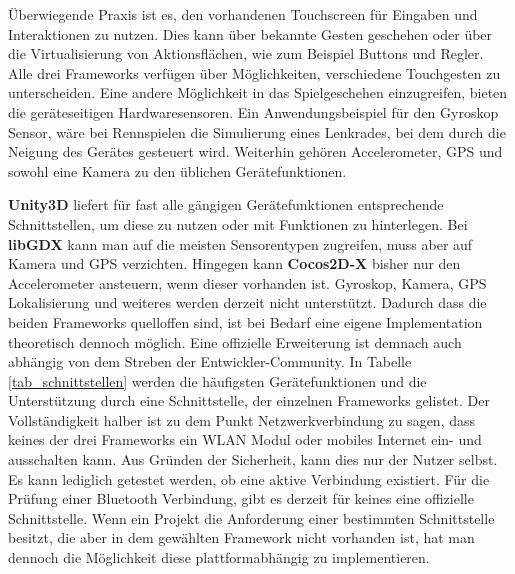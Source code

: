 \bigskip
Überwiegende Praxis ist es, den vorhandenen Touchscreen für Eingaben und Interaktionen zu nutzen. Dies kann über bekannte Gesten geschehen oder über die Virtualisierung von Aktionsflächen, wie zum Beispiel Buttons und Regler. Alle drei Frameworks verfügen über Möglichkeiten, verschiedene Touchgesten zu unterscheiden.
Eine andere Möglichkeit in das Spielgeschehen einzugreifen, bieten die geräteseitigen Hardwaresensoren. Ein Anwendungsbeispiel für den Gyroskop Sensor, wäre bei Rennspielen die Simulierung eines Lenkrades, bei dem durch die Neigung des Gerätes gesteuert wird. Weiterhin gehören Accelerometer, GPS und sowohl eine Kamera zu den üblichen Gerätefunktionen.

\bigskip
\textbf{Unity3D} liefert für fast alle gängigen Gerätefunktionen entsprechende Schnittstellen, um diese zu nutzen oder mit Funktionen zu hinterlegen. Bei \textbf{libGDX} kann man auf die meisten Sensorentypen zugreifen, muss aber auf Kamera und GPS verzichten.
Hingegen kann \textbf{Cocos2D-X} bisher nur den Accelerometer ansteuern, wenn dieser vorhanden ist. Gyroskop, Kamera, GPS Lokalisierung und weiteres werden derzeit nicht unterstützt. Dadurch dass die beiden Frameworks quelloffen sind, ist bei Bedarf eine eigene Implementation theoretisch dennoch möglich. Eine offizielle Erweiterung ist demnach auch abhängig von dem Streben der Entwickler-Community. 
In Tabelle \ref{tab_schnittstellen} werden die häufigsten Gerätefunktionen und die Unterstützung durch eine Schnittstelle, der einzelnen Frameworks gelistet. 
Der Vollständigkeit halber ist zu dem Punkt Netzwerkverbindung zu sagen, dass keines der drei Frameworks ein WLAN Modul oder mobiles Internet ein- und ausschalten kann. Aus Gründen der Sicherheit, kann dies nur der Nutzer selbst. Es kann lediglich getestet werden, ob eine aktive Verbindung existiert. Für die Prüfung einer Bluetooth Verbindung, gibt es derzeit für keines eine offizielle Schnittstelle. Wenn ein Projekt die Anforderung einer bestimmten Schnittstelle besitzt, die aber in dem gewählten Framework nicht vorhanden ist, hat man dennoch die Möglichkeit diese plattformabhängig zu implementieren.

